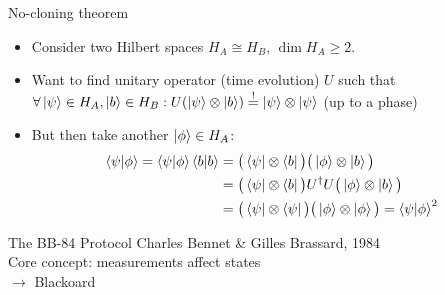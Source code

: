 \documentclass{beamer}
\begin{document}
	\begin{frame}{No-cloning theorem} %
		\begin{itemize}
			\item Consider two Hilbert spaces $H_A \cong H_B$,
			$\operatorname{dim}H_A \geq 2$.

			\item<2-> Want to find unitary operator (time evolution) $U$
			such that $\forall \ket{\psi} \in H_A, \ket{b} \in H_B: U(\ket{\psi} \otimes \ket{b}) \overset{!}{=} \ket{\psi} \otimes \ket{\psi}$ (up to a phase)
			
			\item<3-> But then take another $\ket{\phi} \in H_A$:
				\begin{align*}
					\braket{\psi|\phi} = \braket{\psi|\phi}\braket{b|b} &= \big(\bra{\psi} \otimes \bra{b}\big) \big(\ket{\phi} \otimes \ket{b}\big) \\
					&= \big(\bra{\psi} \otimes \bra{b}\big) U^\dagger U \big(\ket{\phi} \otimes \ket{b}\big) \\
					&= \big(\bra{\psi} \otimes \bra{\psi}\big) \big(\ket{\phi} \otimes \ket{\phi}\big)
					= \braket{\psi|\phi}^2
				\end{align*}



		\end{itemize}
	\end{frame}

	\begin{frame}{The BB-84 Protocol} %
		Charles Bennet \& Gilles Brassard, 1984 \\
		Core concept: measurements affect states \\ 
		$\rightarrow$ Blackoard	
	\end{frame}
\end{document}
